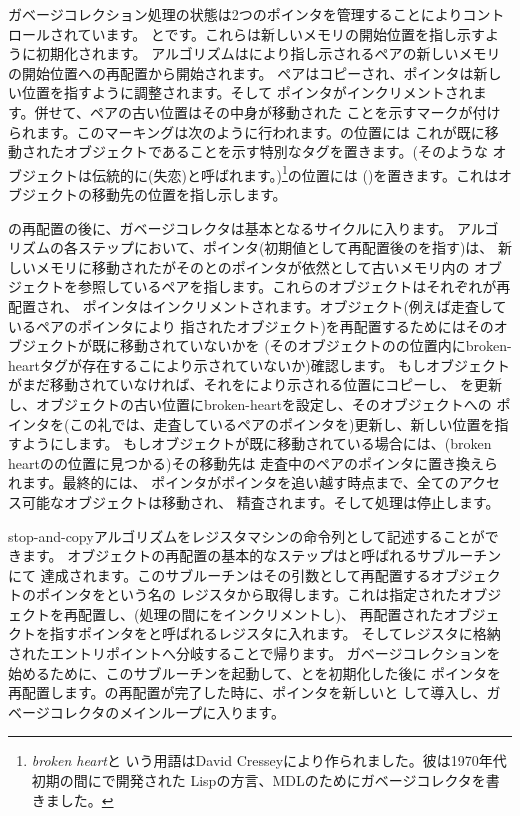 \noindent
ガベージコレクション処理の状態は2つのポインタを管理することによりコントロールされています。
とです。これらは新しいメモリの開始位置を指し示すように初期化されます。
アルゴリズムはにより指し示されるペアの新しいメモリの開始位置への再配置から開始されます。
ペアはコピーされ、ポインタは新しい位置を指すように調整されます。そして
ポインタがインクリメントされます。併せて、ペアの古い位置はその中身が移動された
ことを示すマークが付けられます。このマーキングは次のように行われます。の位置には
これが既に移動されたオブジェクトであることを示す特別なタグを置きます。(そのような
オブジェクトは伝統的に(失恋)と呼ばれます。)\footnote{\emph{broken heart}と
いう用語はDavid Cresseyにより作られました。彼は1970年代初期の間にで開発された
Lispの方言、MDLのためにガベージコレクタを書きました。}の位置には
()を置きます。これはオブジェクトの移動先の位置を指し示します。

の再配置の後に、ガベージコレクタは基本となるサイクルに入ります。
アルゴリズムの各ステップにおいて、ポインタ(初期値として再配置後のを指す)は、
新しいメモリに移動されたがそのとのポインタが依然として古いメモリ内の
オブジェクトを参照しているペアを指します。これらのオブジェクトはそれぞれが再配置され、
ポインタはインクリメントされます。オブジェクト(例えば走査しているペアのポインタにより
指されたオブジェクト)を再配置するためにはそのオブジェクトが既に移動されていないかを
(そのオブジェクトのの位置内にbroken-heartタグが存在するこにより示されていないか)確認します。
もしオブジェクトがまだ移動されていなければ、それをにより示される位置にコピーし、
を更新し、オブジェクトの古い位置にbroken-heartを設定し、そのオブジェクトへの
ポインタを(この礼では、走査しているペアのポインタを)更新し、新しい位置を指すようにします。
もしオブジェクトが既に移動されている場合には、(broken heartのの位置に見つかる)その移動先は
走査中のペアのポインタに置き換えられます。最終的には、
ポインタがポインタを追い越す時点まで、全てのアクセス可能なオブジェクトは移動され、
精査されます。そして処理は停止します。

stop-and-copyアルゴリズムをレジスタマシンの命令列として記述することができます。
オブジェクトの再配置の基本的なステップはと呼ばれるサブルーチンにて
達成されます。このサブルーチンはその引数として再配置するオブジェクトのポインタをという名の
レジスタから取得します。これは指定されたオブジェクトを再配置し、(処理の間にをインクリメントし)、
再配置されたオブジェクトを指すポインタをと呼ばれるレジスタに入れます。
そしてレジスタに格納されたエントリポイントへ分岐することで帰ります。
ガベージコレクションを始めるために、このサブルーチンを起動して、とを初期化した後に
ポインタを再配置します。の再配置が完了した時に、ポインタを新しいと
して導入し、ガベージコレクタのメインループに入ります。

